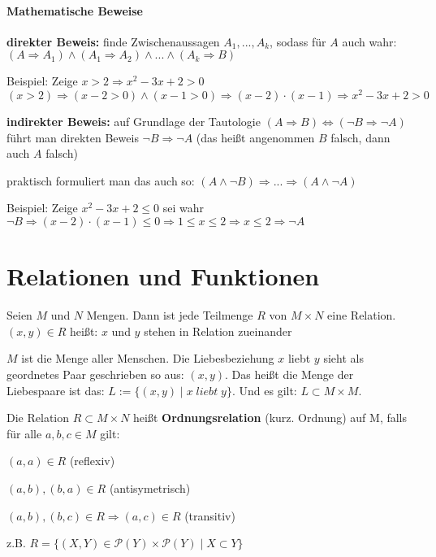 \paragraph{Mathematische Beweise}
\begin{compactitem}
	\item \textbf{direkter Beweis:} finde Zwischenaussagen $A_1,...,A_k$, sodass f\"ur $A$ auch wahr: \\
	$(A \Rightarrow A_1) \land (A_1 \Rightarrow A_2) \land ... \land (A_k \Rightarrow B)$
	\item Beispiel: Zeige $x > 2 \Rightarrow x^2-3x+2>0$ \\
	$(x>2) \Rightarrow (x-2>0) \land (x-1>0) \Rightarrow (x-2) \cdot (x-1) \Rightarrow x^2-3x+2>0$
	\item \textbf{indirekter Beweis:} auf Grundlage der Tautologie $(A \Rightarrow B) \iff 
	(\lnot B \Rightarrow \lnot A)$  f\"uhrt man direkten Beweis $\lnot B \Rightarrow \lnot A$ (das 
	hei{\ss}t angenommen $B$ falsch, dann auch $A$ falsch)
	\item praktisch formuliert man das auch so: $(A \land \lnot B) \Rightarrow ... \Rightarrow (A 
	\land \lnot A)$
	\item Beispiel: Zeige $x^2-3x+2 \le 0$ sei wahr \\
	$\lnot B \Rightarrow (x-2) \cdot (x-1) \le 0 \Rightarrow 1 \le x \le 2 \Rightarrow x \le 2
	\Rightarrow \lnot A$
\end{compactitem}

\section{Relationen und Funktionen}
\begin{mydef}[Relation]
	Seien $M$ und $N$ Mengen. Dann ist jede Teilmenge $R$ von 
	$M \times N$ eine Relation. \\
	$(x,y) \in R$ hei{\ss}t: $x$ und $y$ stehen in Relation zueinander
\end{mydef}

\begin{exmp}
	$M$ ist die Menge aller Menschen. Die Liebesbeziehung $x$ liebt $y$ sieht als geordnetes Paar
	geschrieben so aus: $(x,y)$. Das hei{\ss}t die Menge der Liebespaare ist das: $L := \{(x,y) \mid
	x \; liebt \; y\}$. Und es gilt: $L \subset M \times M$.
\end{exmp}

Die Relation $R \subset M \times N$ hei{\ss}t \textbf{Ordnungsrelation} (kurz. Ordnung) auf M, falls 			f\"ur alle $a,b,c \in M$ gilt:
\begin{compactitem}
	\item $(a,a) \in R$ (reflexiv)
	\item $(a,b),(b,a) \in R$ (antisymetrisch)
	\item $(a,b), (b,c) \in R \Rightarrow (a,c) \in R$ (transitiv)
	\item z.B. $R = \{(X,Y) \in \mathcal P(Y) \times \mathcal P(Y) \mid X \subset Y\}$
\end{compactitem}

